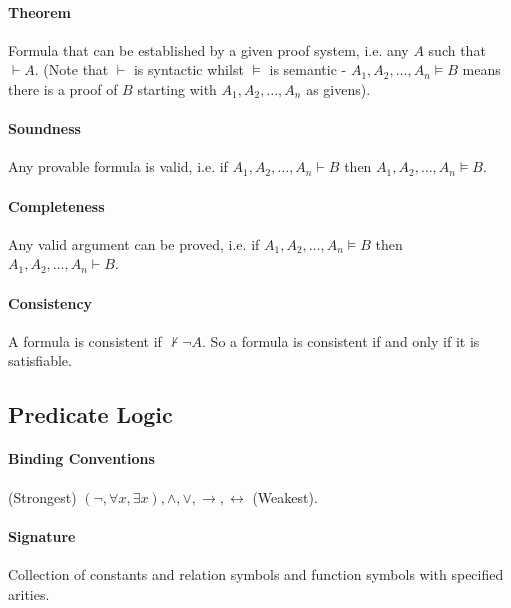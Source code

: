 \documentclass[10pt,twoside,twocolumn]{article}
\begin{document}
\paragraph{Theorem}

Formula that can be established by a given proof system, i.e. any
$A$ such that $\vdash A$. (Note that $\vdash$ is syntactic whilst
$\vDash$ is semantic - $A_{1},A_{2},\dots,A_{n}\vDash B$ means there
is a proof of $B$ starting with $A_{1},A_{2},\dots,A_{n}$ as givens).


\paragraph{Soundness}

Any provable formula is valid, i.e. if $A_{1},A_{2},\dots,A_{n}\vdash B$
then $A_{1},A_{2},\dots,A_{n}\vDash B$.


\paragraph{Completeness}

Any valid argument can be proved, i.e. if $A_{1},A_{2},\dots,A_{n}\vDash B$
then $A_{1},A_{2},\dots,A_{n}\vdash B$.


\paragraph{Consistency}

A formula is consistent if $\not\vdash\lnot A$. So a formula is consistent
if and only if it is satisfiable.


\subsection{Predicate Logic}


\paragraph{Binding Conventions}

(Strongest) $(\lnot,\forall x,\exists x),\land,\lor,\rightarrow,\leftrightarrow$ (Weakest).


\paragraph{Signature}

Collection of constants and relation symbols and function symbols
with specified arities.
\end{document}
